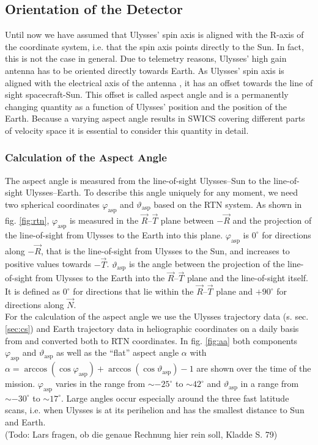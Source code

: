 \subsection{Orientation of the Detector}
Until now we have assumed that Ulysses' spin axis is aligned with the R-axis of the coordinate system, i.e. that the spin axis points directly to the Sun. In fact, this is not the case in general. Due to telemetry reasons, Ulysses' high gain antenna has to be oriented directly towards Earth. As Ulysses' spin axis is aligned with the electrical axis of the antenna \citep{wenzel_ulysses}, it has an offset towards the line of sight spacecraft-Sun. This offset is called aspect angle and is a permanently changing quantity as a function of Ulysses' position and the position of the Earth. Because a varying aspect angle results in SWICS covering different parts of velocity space it is essential to consider this quantity in detail.
%
%
\subsubsection{Calculation of the Aspect Angle}
The aspect angle is measured from the line-of-sight Ulysses--Sun to the line-of-sight Ulysses--Earth. To describe this angle uniquely for any moment, we need two spherical coordinates $\varphi_{\mathrm{asp}}$ and $\vartheta_{\mathrm{asp}}$ based on the RTN system. As shown in fig. \ref{fig:rtn}, $\varphi_{\mathrm{asp}}$ is measured in the $\vec{R}$--$\vec{T}$ plane between $-\vec{R}$ and the projection of the line-of-sight from Ulysses to the Earth into this plane. $\varphi_{\mathrm{asp}}$  is $0^\circ$ for directions along $-\vec{R}$, that is the line-of-sight from Ulysses to the Sun, and increases to positive values towards $-\vec{T}$. $\vartheta_{\mathrm{asp}}$ is the angle between the projection of the line-of-sight from Ulysses to the Earth into the $\vec{R}$--$\vec{T}$ plane and the line-of-sight itself. It is defined as $0^\circ$ for directions that lie within the $\vec{R}$--$\vec{T}$ plane and $+90^\circ$ for directions along $\vec{N}$.\\
For the calculation of the aspect angle we use the Ulysses trajectory data (s. sec. \ref{sec:cs}) and Earth trajectory data in heliographic coordinates on a daily basis from \citet{nasa-earth-coord} and converted both to RTN coordinates. In fig. \ref{fig:aa} both components $\varphi_{\mathrm{asp}}$ and $\vartheta_{\mathrm{asp}}$ as well as the ``flat'' aspect angle $\alpha$ with  $\alpha = \arccos(\cos{\varphi_{\mathrm{asp}}}) + \arccos(\cos{\vartheta_{\mathrm{asp}}}) -1$ are shown over the time of the mission. $\varphi_{\mathrm{asp}}$ varies in the range from $\sim - 25^\circ$ to $\sim 42^\circ$ and $\vartheta_{\mathrm{asp}}$ in a range from $\sim - 30^\circ$ to $\sim 17^\circ$. Large angles occur especially around the three fast latitude scans, i.e. when Ulysses is at its perihelion and has the smallest distance to Sun and Earth.\\
(Todo: Lars fragen, ob die genaue Rechnung hier rein soll, Kladde S. 79)

